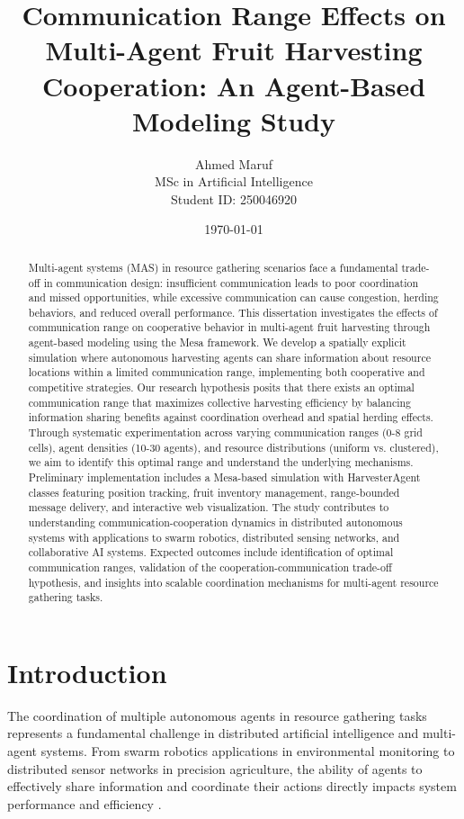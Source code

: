 \documentclass[12pt,a4paper]{article}
\title{\textbf{Communication Range Effects on Multi-Agent Fruit Harvesting Cooperation: An Agent-Based Modeling Study}}
\author{Ahmed Maruf \\ MSc in Artificial Intelligence \\ Student ID: 250046920}
\date{\today}
\begin{document}
\maketitle

\begin{abstract}
Multi-agent systems (MAS) in resource gathering scenarios face a fundamental trade-off in communication design: insufficient communication leads to poor coordination and missed opportunities, while excessive communication can cause congestion, herding behaviors, and reduced overall performance. This dissertation investigates the effects of communication range on cooperative behavior in multi-agent fruit harvesting through agent-based modeling using the Mesa framework. We develop a spatially explicit simulation where autonomous harvesting agents can share information about resource locations within a limited communication range, implementing both cooperative and competitive strategies. Our research hypothesis posits that there exists an optimal communication range that maximizes collective harvesting efficiency by balancing information sharing benefits against coordination overhead and spatial herding effects. Through systematic experimentation across varying communication ranges (0-8 grid cells), agent densities (10-30 agents), and resource distributions (uniform vs. clustered), we aim to identify this optimal range and understand the underlying mechanisms. Preliminary implementation includes a Mesa-based simulation with HarvesterAgent classes featuring position tracking, fruit inventory management, range-bounded message delivery, and interactive web visualization. The study contributes to understanding communication-cooperation dynamics in distributed autonomous systems with applications to swarm robotics, distributed sensing networks, and collaborative AI systems. Expected outcomes include identification of optimal communication ranges, validation of the cooperation-communication trade-off hypothesis, and insights into scalable coordination mechanisms for multi-agent resource gathering tasks.
\end{abstract}

\section{Introduction}
\label{sec:introduction}

The coordination of multiple autonomous agents in resource gathering tasks represents a fundamental challenge in distributed artificial intelligence and multi-agent systems. From swarm robotics applications in environmental monitoring to distributed sensor networks in precision agriculture, the ability of agents to effectively share information and coordinate their actions directly impacts system performance and efficiency \parencite{dorigo2004ant, cao1997cooperative}.
\end{document}
